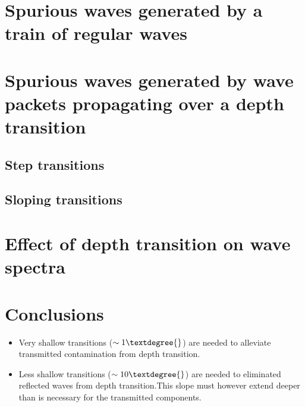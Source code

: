 \documentclass[internal]{sintefmemo}
\renewcommand{\_}[1]{_\mr{#1}}
\begin{document}
\section{Spurious waves generated by a train of regular waves}
\label{sec:train}




\section{Spurious waves generated by wave packets propagating over a depth transition}

\subsection{Step transitions}
\label{sec:packetStep}
 

\subsection{Sloping transitions}
\label{sec:packetSlope}



\section{Effect of depth transition on wave spectra}
\label{sec:spectra}

 
\section{Conclusions}
\begin{itemize}
	\item Very shallow transitions ($\sim 1\textdegree{}$) are needed to alleviate transmitted contamination from depth transition.
	\item Less shallow transitions ($\sim 10\textdegree{}$) are needed to eliminated reflected waves from depth transition.This slope must however extend deeper than is necessary for the transmitted components. 
\end{itemize}



\end{document}
